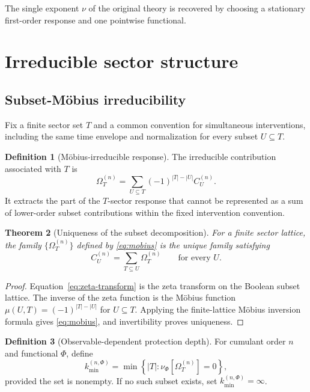\documentclass[11pt]{article}
\newtheorem{theorem}{Theorem}[section]
\theoremstyle{definition}
\newtheorem{definition}[theorem]{Definition}
\theoremstyle{remark}
\newcommand{\PhiF}{\Phi}
\newcommand{\OmegaI}{\Omega}
\begin{document}
The single exponent $\nu$ of the original theory is recovered by choosing a stationary first-order response and one pointwise functional.

\section{Irreducible sector structure}

\subsection{Subset-M\"obius irreducibility}

Fix a finite sector set $T$ and a common convention for simultaneous interventions, including the same time envelope and normalization for every subset $U\subseteq T$.

\begin{definition}[M\"obius-irreducible response]\label{def:mobius}
The irreducible contribution associated with $T$ is
\begin{equation}
\boxed{
\OmegaI_T^{(n)}
 = \sum_{U\subseteq T}(-1)^{|T|-|U|}C_U^{(n)}.
}
\label{eq:mobius}
\end{equation}
It extracts the part of the $T$-sector response that cannot be represented as a sum of lower-order subset contributions within the fixed intervention convention.
\end{definition}

\begin{theorem}[Uniqueness of the subset decomposition]\label{thm:mobius-unique}
For a finite sector lattice, the family $\{\OmegaI_T^{(n)}\}$ defined by \eqref{eq:mobius} is the unique family satisfying
\begin{equation}
C_U^{(n)}=\sum_{T\subseteq U}\OmegaI_T^{(n)}
\qquad\text{for every }U.
\label{eq:zeta-transform}
\end{equation}
\end{theorem}

\begin{proof}
Equation~\eqref{eq:zeta-transform} is the zeta transform on the Boolean subset lattice. The inverse of the zeta function is the M\"obius function $\mu(U,T)=(-1)^{|T|-|U|}$ for $U\subseteq T$. Applying the finite-lattice M\"obius inversion formula gives \eqref{eq:mobius}, and invertibility proves uniqueness.
\end{proof}

\begin{definition}[Observable-dependent protection depth]\label{def:protection-depth}
For cumulant order $n$ and functional $\PhiF$, define
\begin{equation}
\boxed{
k_{\min}^{(n,\PhiF)}
 = \min\left\{|T|:\nu_{\PhiF}[\OmegaI_T^{(n)}]=0\right\},
}
\label{eq:protection-depth}
\end{equation}
provided the set is nonempty. If no such subset exists, set $k_{\min}^{(n,\PhiF)}=\infty$.
\end{definition}
\end{document}

